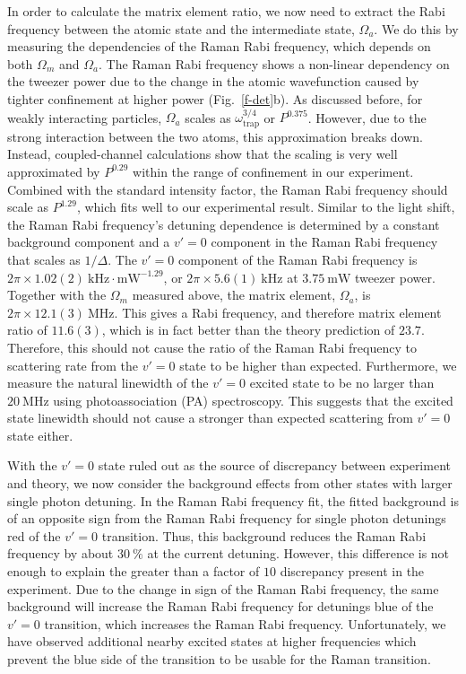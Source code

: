 \documentclass[aps,prl,twocolumn,10pt,superscriptaddress]{revtex4-1}
\begin{document}
In order to calculate the matrix element ratio,
we now need to extract the Rabi frequency between the atomic state and the intermediate state, $ \Omega_a $.
We do this by measuring the dependencies of the Raman Rabi frequency,
which depends on both $\Omega_m$ and $\Omega_a$.
The Raman Rabi frequency shows a non-linear dependency on the tweezer power
due to the change in the atomic wavefunction caused by
tighter confinement at higher power (Fig.~\ref{f-det}b).
As discussed before, for weakly interacting particles,
$\Omega_a$ scales as $ \omega_{\text{trap}}^{3/4}$ or $P^{0.375}$.
However, due to the strong interaction between the two atoms, this approximation breaks down.
Instead, coupled-channel calculations show that the scaling
is very well approximated by $P^{0.29}$ within the range of confinement in our experiment.
Combined with the standard intensity factor, the Raman Rabi frequency should scale as $P^{1.29}$,
which fits well to our experimental result.
Similar to the light shift, the Raman Rabi frequency's detuning dependence is determined by a constant background component and
a $v'=0$ component in the Raman Rabi frequency that scales as $1/\Delta$.
The $v'=0$ component of the Raman Rabi frequency is
$2\pi\times1.02(2)~\mathrm{kHz\cdot mW^{-1.29}}$,
or $2\pi \times 5.6(1)~\mathrm{kHz}$ at $3.75~\mathrm{mW}$ tweezer power.
Together with the $\Omega_m$ measured above, the matrix element, $ \Omega_a $, is
$2\pi \times 12.1(3)~\mathrm{MHz}$.
This gives a Rabi frequency, and therefore matrix element ratio of $11.6(3)$,
which is in fact better than the theory prediction of $23.7$.
Therefore, this should not cause the ratio of the Raman Rabi frequency to scattering rate
from the $v'=0$ state to be higher than expected.
Furthermore, we measure the natural linewidth of the $v'=0$ excited state to be no larger than $20~\mathrm{MHz}$ using photoassociation (PA) spectroscopy.
This suggests that the excited state linewidth should not cause
a stronger than expected scattering from $v'=0$ state either.

With the $ v' = 0 $ state ruled out as the source of discrepancy between experiment and theory,
we now consider the background effects from other states with larger single photon detuning.
In the Raman Rabi frequency fit, the fitted background is of an opposite sign from the Raman Rabi frequency for single photon detunings red of the $v' = 0 $ transition. Thus, this background reduces the Raman Rabi frequency by about $30~\mathrm{\%}$ at the current detuning.
However, this difference is not enough to explain the greater than a factor of $10$ discrepancy
present in the experiment.
Due to the change in sign of the Raman Rabi frequency, the same background will increase the Raman Rabi frequency for detunings blue of the $v' = 0$ transition, which increases the Raman Rabi frequency. Unfortunately, we have observed additional nearby excited states at higher frequencies
which prevent the blue side of the transition to be usable for the Raman transition.
\end{document}
